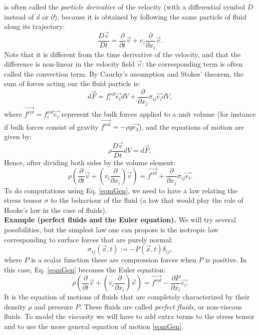 \documentclass[DIV=12]{article}
\newcommand{\fVol}{\vec{f^{vol}}}
\begin{document}
 is often called the {\emph{particle derivative}} of the velocity (with a differential symbol $D$ instead of $d$ or $\partial$), because it is obtained
 by following the same particle of fluid along its trajectory:
\begin{equation}
 \frac{D\vec{v}}{Dt} = \frac{\partial}{\partial t} \vec{v} + v_i   \frac{\partial }{\partial x_i} \vec{v}.
\label{particleDer}
\end{equation}
Note that it is different from the time derivative of the velocity, and that the difference is non-linear
 in the velocity field $\vec{v}$: the corresponding term is often called the convection term.
 By Cauchy's assumption and Stokes' theorem, the sum of forces acting 
 our the fluid particle is:
\begin{equation}
d\vec{F} = f^{vol}_i \vec{e_i} dV + \frac{\partial}{\partial x_j}\sigma_{ij}\vec{e_i} dV,
\end{equation}
 where $\fVol = f^{vol}_i \vec{e_i}$ represent the bulk forces applied to a unit volume (for instance
if bulk forces consist of gravity  $\fVol = - \rho g \vec{e_3}$), 
 and the equations of motion are given by:
\begin{equation}
\rho\frac{D\vec{v}}{Dt} dV=  d\vec{F},
\label{eom}
\end{equation}
 Hence, after dividing both sides by the volume element:
\begin{equation}
\boxed{
\rho\left( \frac{\partial}{\partial t} \vec{v} + \left( v_i   \frac{\partial }{\partial x_i}\right) \vec{v}\right) =  \fVol + \frac{\partial}{\partial x_j}\sigma_{ij}\vec{e_i}.}
 \label{eomGen}
 \end{equation} 
To do computations using Eq. \ref{eomGen}, we need to have a law relating the stress tensor $\sigma$ to the behaviour
of the fluid (a law that would play the role of Hooke's law in the case of fluids).\\

{\bf{Example (perfect fluids and the Euler equation).}} We will try several possibilities,
 but the simplest  law one can propose is the isotropic law corresponding to surface forces that 
 are purely normal:
\begin{equation}
\sigma_{ij}(\vec{x},t) := - P(\vec{x},t) \delta_{ij},
\label{isotropic}
\end{equation}
where $P$ is a scalar function
these are compression forces when $P$ is positive. In this case,  Eq. \ref{eomGen}
 becomes the Euler equation:
\begin{equation}
\rho\left( \frac{\partial}{\partial t} \vec{v} + \left( v_i   \frac{\partial }{\partial x_i}\right)  \vec{v}\right) = \fVol  - \frac{\partial P}{\partial x_i}\vec{e_i}.
\label{Euler}
\end{equation}
It is the equation of motions of fluids that are completely characterized by their density $\rho$ and pressure $P$. 
 These fluids are called {\emph{perfect fluids}}, or non-viscous fluids. To model the viscosity we will have to add extra terms 
 to the stress tensor and to use the more general equation of motion \ref{eomGen}.
\end{document}
